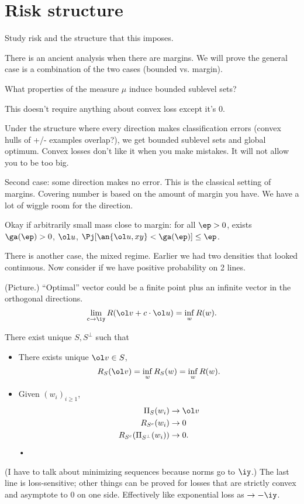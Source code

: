 \section{Risk structure}

Study risk and the structure that this imposes.

There is an ancient analysis when there are margins. We will prove the general case is a combination of the two cases (bounded vs. margin).

What properties of the measure $\mu$ induce bounded sublevel sets? %

This doesn't require anything about convex loss except it's 0.

Under the structure where every direction makes classification errors (convex hulls of +/- examples overlap?), we get bounded sublevel sets and global optimum. Convex losses don't like it when you make mistakes. It will not allow you to be too big.

Second case: some direction makes no error. This is the classical setting of margins.
Covering number is based on the amount of margin you have. We have a lot of wiggle room for the direction.

Okay if arbitrarily small mass close to margin: for all $\ep>0$, exists $\ga(\ep)>0$, $\ol u$, $\Pj[\an{\ol u, xy}<\ga(\ep)]\le \ep$.


There is another case, the mixed regime. Earlier we had two densities that looked continuous. Now consider if we have positive probability on 2 lines.

(Picture.) ``Optimal'' vector could be a finite point plus an infinite vector in the orthogonal directions.
$$
\lim_{c\to \iy} R(\ol v + c\cdot \ol u) = \inf_w R(w).
$$

\begin{thm}
There exist unique $S,S^{\perp}$ such that
\begin{itemize}
\item
 There exists unique $\ol v\in S$,
 $$
 R_S(\ol v) = \inf_w R_S(w) = \inf_w R(w).
 $$
\item
Given $(w_i)_{i\ge 1}$,
\begin{align}
\Pi_S(w_i)&\to \ol v\\
R_{S^c}(w_i)&\to 0\\
R_{S^c}(\Pi_{S^{\perp}}(w_i))&\to 0.
\end{align}•
\end{itemize}
\end{thm}
(I have to talk about minimizing sequences because norms go to $\iy$.) %
The last line is loss-sensitive; other things can be proved for losses that are strictly convex and asymptote to 0 on one side.
Effectively like exponential loss as $\to -\iy$.

